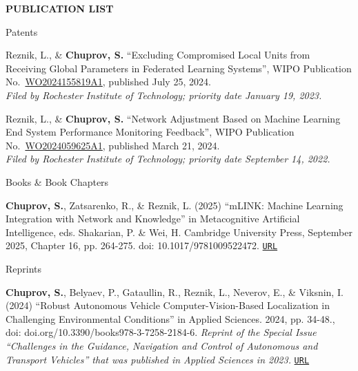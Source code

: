 \newpage

\centering \Large \textbf{PUBLICATION LIST}
\normalsize

\begin{rSection}{Patents}
\begin{enumerate}[label=[P{{\arabic*}]}]

\item Reznik, L., \& \textbf{Chuprov, S.} ``Excluding Compromised Local Units from Receiving Global Parameters in Federated Learning Systems'', WIPO Publication No.\ \href{https://patents.google.com/patent/WO2024155819A1}{WO2024155819A1}, published July 25, 2024.\\
\scriptsize \textit{Filed by Rochester Institute of Technology; priority date January 19, 2023.}\normalsize

\item Reznik, L., \& \textbf{Chuprov, S.} ``Network Adjustment Based on Machine Learning End System Performance Monitoring Feedback'', WIPO Publication No.\ \href{https://patents.google.com/patent/WO2024059625A1}{WO2024059625A1}, published March 21, 2024.\\
\scriptsize \textit{Filed by Rochester Institute of Technology; priority date September 14, 2022.}\normalsize

\end{enumerate}
\end{rSection}

\begin{rSection}{Books \& Book Chapters}
\begin{enumerate}[label=[B{{\arabic*}]}]

\item \textbf{Chuprov, S.}, Zatsarenko, R., \& Reznik, L. (2025) ``mLINK: Machine Learning Integration with Network and Knowledge'' in Metacognitive Artificial Intelligence, eds. Shakarian, P. \& Wei, H. Cambridge University Press, September 2025, Chapter 16, pp. 264-275. doi: 10.1017/9781009522472. \href{https://www.cambridge.org/core/books/metacognitive-artificial-intelligence/480C122CA4645E8790DBE9FE09330F62}{\nolinkurl{URL}}

\end{enumerate}
\end{rSection}


\begin{rSection}{Reprints}
\begin{enumerate}[label=[R{{\arabic*}]}]

\item \textbf{Chuprov, S.}, Belyaev, P., Gataullin, R., Reznik, L., Neverov, E., \& Viksnin, I. (2024) ``Robust Autonomous
Vehicle Computer-Vision-Based Localization in Challenging Environmental Conditions'' in Applied Sciences. 2024, pp. 34-48., doi: doi.org/10.3390/books978-3-7258-2184-6.  \textit{Reprint of the Special Issue ``Challenges in the Guidance, Navigation and Control of Autonomous and Transport Vehicles'' that was published in Applied Sciences in 2023.} \href{https://www.mdpi.com/books/reprint/9926-challenges-in-the-guidance-navigation-and-control-of-autonomous-and-transport-vehicles}{\nolinkurl{URL}}

\end{enumerate}
\end{rSection}

